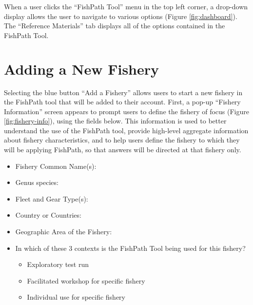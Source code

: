 \documentclass[
  11pt,
]{book}
\providecommand{\tightlist}{%
  \setlength{\itemsep}{0pt}\setlength{\parskip}{0pt}}
\begin{document}
When a user clicks the ``FishPath Tool'' menu in the top left corner, a drop-down display allows the user to navigate to various options (Figure \ref{fig:dashboard}). The ``Reference Materials'' tab displays all of the options contained in the FishPath Tool.

\hypertarget{adding-a-new-fishery}{%
\section{Adding a New Fishery}\label{adding-a-new-fishery}}

Selecting the blue button ``Add a Fishery'' allows users to start a new fishery in the FishPath tool that will be added to their account. First, a pop-up ``Fishery Information'' screen appears to prompt users to define the fishery of focus (Figure \ref{fig:fishery-info}), using the fields below. This information is used to better understand the use of the FishPath tool, provide high-level aggregate information about fishery characteristics, and to help users define the fishery to which they will be applying FishPath, so that answers will be directed at that fishery only.

\begin{itemize}
\tightlist
\item
  Fishery Common Name(s):
\item
  Genus species:
\item
  Fleet and Gear Type(s):
\item
  Country or Countries:
\item
  Geographic Area of the Fishery:
\item
  In which of these 3 contexts is the FishPath Tool being used for this fishery?

  \begin{itemize}
  \tightlist
  \item
    Exploratory test run\\
  \item
    Facilitated workshop for specific fishery
  \item
    Individual use for specific fishery
  \end{itemize}
\end{itemize}
\end{document}
